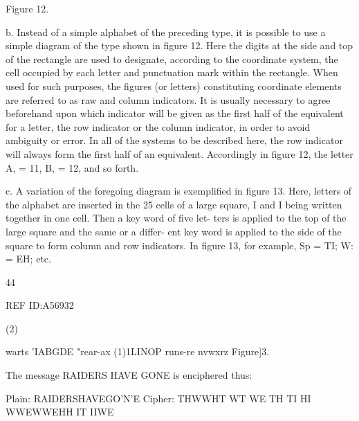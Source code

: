 {{ 

 

 

 

 

 

 

 

Figure 12.

b. Instead of a simple alphabet of the preceding type, it is possible
to use a simple diagram of the type shown in ﬁgure 12. Here the digits
at the side and top of the rectangle are used to designate, according to
the coordinate system, the cell occupied by each letter and punctuation
mark within the rectangle. When used for such purposes, the ﬁgures (or
letters) constituting coordinate elements are referred to as raw and
column indicators. It is usually necessary to agree beforehand upon
which indicator will be given as the ﬁrst half of the equivalent for a
letter, the row indicator or the column indicator, in order to avoid
ambiguity or error. In all of the systems to be described here, the row
indicator will always form the ﬁrst half of an equivalent. Accordingly
in ﬁgure 12, the letter A, = 11, B, = 12, and so forth.

c. A variation of the foregoing diagram is exempliﬁed in ﬁgure 13.
Here, letters of the alphabet are inserted in the 25 cells of a large square,
I and I being written together in one cell. Then a key word of ﬁve let-
ters is applied to the top of the large square and the same or a differ-
ent key word is applied to the side of the square to form column and row
indicators. In ﬁgure 13, for example, Sp = TI; W: = EH; etc.

44

REF ID:A56932

(2)

 

 

 

 

 

 

 

 

 

 

 

 

warts
'IABGDE
"rear-ax
(1)1LINOP
runs-re
nvwxrz
Figure]3.

The message RAIDERS HAVE GONE is enciphered thus:

Plain: RAIDERSHAVEGO'N'E
Cipher: THWWHT WT WE TH TI HI WWEWWEHH IT IIWE

}}
